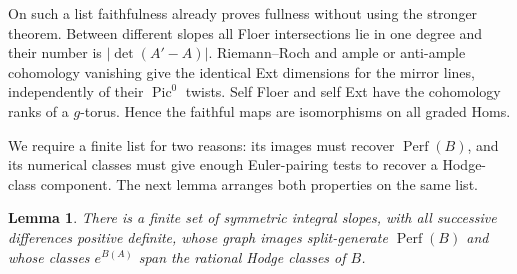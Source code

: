 \documentclass[11pt]{article}
\numberwithin{equation}{section}
\newtheorem{lemma}[theorem]{Lemma}
\theoremstyle{definition}
\theoremstyle{remark}
\begin{document}
On such a list faithfulness already proves fullness without using the
stronger theorem.  Between different slopes all Floer intersections lie
in one degree and their number is $|\det(A'-A)|$.  Riemann--Roch and
ample or anti-ample cohomology vanishing give the identical Ext dimensions
for the mirror lines, independently of their $\operatorname{Pic}^0$
twists.  Self Floer and self Ext have the cohomology ranks of a
$g$-torus.  Hence the faithful maps are isomorphisms on all graded Homs.

We require a finite list for two reasons: its images must recover
$\operatorname{Perf}(B)$, and its numerical classes must give enough Euler-pairing
tests to recover a Hodge-class component.  The next lemma arranges
both properties on the same list.

\begin{lemma}\label{lem:graph-generators}
There is a finite set of symmetric integral slopes, with all successive
differences positive definite, whose graph images split-generate
$\operatorname{Perf}(B)$ and whose classes $e^{B(A)}$ span the rational Hodge classes
of $B$.
\end{lemma}
\end{document}
